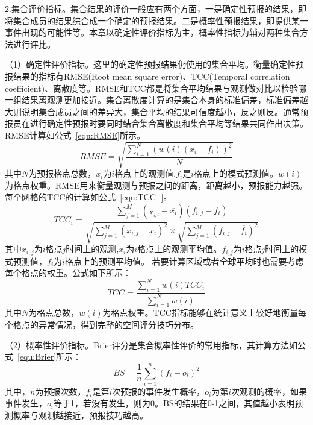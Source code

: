 2.集合评价指标。集合结果的评价一般应有两个方面，一是确定性预报的结果，即将集合成员的结果综合成一个确定的预报结果。二是概率性预报结果，即提供某一事件出现的可能性等。本章以确定性评价指标为主，概率性指标为辅对两种集合方法进行评比。

（1）确定性评价指标。这里的确定性预报结果仍使用的集合平均。衡量确定性预报结果的指标有RMSE(Root mean square error)、TCC(Temporal correlation coefficient)、离散度等。RMSE和TCC都是将集合平均结果与观测做对比以检验哪一组结果离观测更加接近。集合离散度计算的是集合本身的标准偏差，标准偏差越大则说明集合成员之间的差异大，集合平均的结果可信度越小，反之则反。通常预报员在进行确定性预报时要同时结合集合离散度和集合平均等结果共同作出决策。RMSE计算如公式~\ref{equ:RMSE}所示。
\begin{equation}
\label{equ:RMSE}
R M S E = \sqrt { \frac { \sum _ { i = 1 } ^ { N } \left(  w(i)  (  x _ { i } - f _ { i } ) \right) ^ { 2 } } { N } }
\end{equation}
其中$N$为预报格点总数，$x _ { i }$为$i$格点上的观测值,$f _ {  i }$是$i$格点上的模式预测值。$w(i)$为格点权重。RMSE用来衡量观测与预报之间的距离，距离越小，预报能力越强。
每个网格的TCC的计算如公式~\ref{equ:TCC i}。
\begin{equation}
\label{equ:TCC i}
T C C _ { i } =  \frac { \sum _ { j = 1 } ^ { M } \left( _ { X _ { i , j } } - \overline { x _ { i } } \right) \left( f _ { i , j } - \overline { f _ { i } } \right) } { \sqrt { \sum _ { j = 1 } ^ { M } \left( x _ { i , j } - \overline { x _ { i } } \right) ^ { 2 } } \times \sqrt { \sum _ { j = 1 } ^ { M } \left( f _ { i , j } - \overline { f _ { i } } \right) ^ { 2 } } }
\end{equation}
其中$x _ { i , j }$为$i$格点$j$时间上的观测,$x _ { i }$为$i$格点上的观测平均值。$ f _ { i , j }$为$i$格点$j$时间上的模式预测值，$f _ { i }$为$i$格点上的预测平均值。
若要计算区域或者全球平均时也需要考虑每个格点的权重。公式如下所示：
\begin{equation}
\label{equ:Rasfuc}
T C C = \frac { \sum _ { i = 1 } ^ { N } w(i) T C C _ { i } } { \sum _ { i = 1 } ^ { N } w(i) }
\end{equation}
其中$N$为格点总数，$w(i)$为格点权重。TCC指标能够在统计意义上较好地衡量每个格点的异常情况，得到完整的空间评分技巧分布。

（2）概率性评价指标。Brier评分是集合概率性评价的常用指标，其计算方法如公式~\ref{equ:Brier}所示：
\begin{equation}
\label{equ:Brier}
B S = \frac { 1 } { n } \sum _ { i = 1 } ^ { n } \left( f _ { i } - o _ { i } \right) ^ { 2 }
\end{equation}
其中，$n$为预报次数，$f _ { i }$是第$i$次预报的事件发生概率，$o _ { i }$为第$i$次观测的概率，如果事件发生，$o _ { i }$等于1，若没有发生，则为0。BS的结果在0-1之间，其值越小表明预测概率与观测越接近，预报技巧越高。

